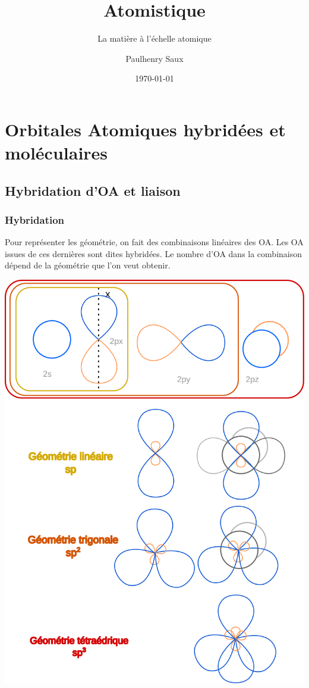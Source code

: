 \documentclass[french]{yLectureNote}
\title{Atomistique}
\subtitle{La matière à l'échelle atomique}
\author{Paulhenry Saux}
\date{\today}
\begin{document}
\setcounter{chapter}{3}
\chapter{Orbitales Atomiques hybridées et moléculaires}
\section{Hybridation d'OA et liaison}
\subsection{Hybridation}
Pour représenter les géométrie, on fait des combinaisons linéaires des OA. Les OA issues de ces dernières sont dites hybridées. Le nombre d'OA dans la combinaison dépend de la géométrie que l'on veut obtenir.

\includegraphics[scale=0.25]{hybridation}
\end{document}
